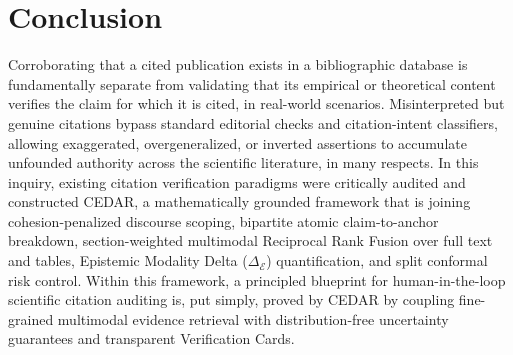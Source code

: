 \documentclass[journal]{IEEEtran}
\begin{document}
\section{Conclusion}
\label{sec:conclusion}

Corroborating that a cited publication exists in a bibliographic database is fundamentally separate from validating that its empirical or theoretical content verifies the claim for which it is cited, in real-world scenarios. Misinterpreted but genuine citations bypass standard editorial checks and citation-intent classifiers, allowing exaggerated, overgeneralized, or inverted assertions to accumulate unfounded authority across the scientific literature, in many respects. In this inquiry, existing citation verification paradigms were critically audited and constructed CEDAR, a mathematically grounded framework that is joining cohesion-penalized discourse scoping, bipartite atomic claim-to-anchor breakdown, section-weighted multimodal Reciprocal Rank Fusion over full text and tables, Epistemic Modality Delta ($\Delta_{\mathcal{E}}$) quantification, and split conformal risk control. Within this framework, a principled blueprint for human-in-the-loop scientific citation auditing is, put simply, proved by CEDAR by coupling fine-grained multimodal evidence retrieval with distribution-free uncertainty guarantees and transparent Verification Cards.



\end{document}
